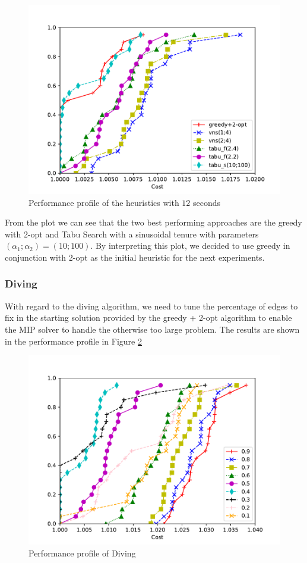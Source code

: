 \documentclass{article}
\begin{document}
\begin{figure}[ht]
        \caption{Performance profile of the heuristics with $12$ seconds}
        \label{fig:ht_best12}
        \centering
        \includegraphics[width=340pt]{assets/ht_best12.pdf}
\end{figure}

From the plot we can see that the two best performing approaches are the greedy
with 2-opt and Tabu Search with a sinusoidal tenure with parameters
$\left(\alpha_1; \alpha_2\right) = \left(10;100\right)$.
By interpreting this plot, we decided to use greedy in conjunction with 2-opt
as the initial heuristic for the next experiments.

\clearpage
\subsubsection{Diving}
With regard to the diving algorithm, we need to tune the percentage of edges to fix
in the starting solution provided by the greedy + 2-opt algorithm
to enable the MIP solver to handle the otherwise too large problem.
The results are shown in the performance profile in Figure \ref{fig:ht_diving}

\begin{figure}[ht]
        \caption{Performance profile of Diving}
        \label{fig:ht_diving}
        \centering
        \includegraphics[width=340pt]{assets/ht_diving.pdf}
\end{figure}
\end{document}
